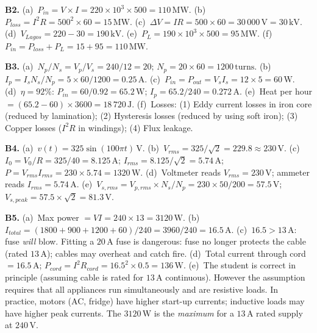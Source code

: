 \textbf{B2.}
(a)~$P_{in}=V\times I=220\times10^3\times500
=110\,\text{MW}$. \quad
(b)~$P_{loss}=I^2R=500^2\times60=15\,\text{MW}$.
\quad
(c)~$\Delta V=IR=500\times60=30\,000\,\text{V}
=30\,\text{kV}$. \quad
(d)~$V_{Lagos}=220-30=190\,\text{kV}$. \quad
(e)~$P_L=190\times10^3\times500=95\,\text{MW}$. \quad
(f)~$P_{in}=P_{loss}+P_L=15+95=110\,\text{MW}$. \checkmark

\textbf{B3.}
(a)~$N_p/N_s=V_p/V_s=240/12=20$;
$N_p=20\times60=1200\,\text{turns}$. \quad
(b)~$I_p=I_sN_s/N_p=5\times60/1200=0.25\,\text{A}$.
\quad
(c)~$P_{in}=P_{out}=V_sI_s=12\times5=60\,\text{W}$.
\quad
(d)~$\eta=92\%$: $P_{in}=60/0.92=65.2\,\text{W}$;
$I_p=65.2/240=0.272\,\text{A}$. \quad
(e)~Heat per hour $=(65.2-60)\times3600
=18\,720\,\text{J}$. \quad
(f)~Losses: (1) Eddy current losses in iron core
(reduced by lamination); (2) Hysteresis losses (reduced
by using soft iron); (3) Copper losses ($I^2R$ in
windings); (4) Flux leakage.

\textbf{B4.}
(a)~$v(t)=325\sin(100\pi t)\,\text{V}$. \quad
(b)~$V_{rms}=325/\sqrt{2}=229.8\approx230\,\text{V}$.
\quad
(c)~$I_0=V_0/R=325/40=8.125\,\text{A}$;
$I_{rms}=8.125/\sqrt{2}=5.74\,\text{A}$;
$P=V_{rms}I_{rms}=230\times5.74=1320\,\text{W}$. \quad
(d)~Voltmeter reads $V_{rms}=230\,\text{V}$;
ammeter reads $I_{rms}=5.74\,\text{A}$. \quad
(e)~$V_{s,rms}=V_{p,rms}\times N_s/N_p
=230\times50/200=57.5\,\text{V}$;
$V_{s,peak}=57.5\times\sqrt{2}=81.3\,\text{V}$.

\textbf{B5.}
(a)~Max power $=VI=240\times13=3120\,\text{W}$. \quad
(b)~$I_{total}=(1800+900+1200+60)/240
=3960/240=16.5\,\text{A}$. \quad
(c)~$16.5>13\,\text{A}$: fuse \textit{will} blow.
Fitting a $20\,\text{A}$ fuse is dangerous: fuse no
longer protects the cable (rated $13\,\text{A}$);
cables may overheat and catch fire. \quad
(d)~Total current through cord $=16.5\,\text{A}$;
$P_{cord}=I^2R_{cord}=16.5^2\times0.5
=136\,\text{W}$. \quad
(e)~The student is correct in principle (assuming cable
is rated for $13\,\text{A}$ continuous). However the
assumption requires that all appliances run simultaneously
and are resistive loads. In practice, motors (AC, fridge)
have higher start-up currents; inductive loads may have
higher peak currents. The $3120\,\text{W}$ is the
\textit{maximum} for a $13\,\text{A}$ rated supply
at $240\,\text{V}$.

\endgroup


